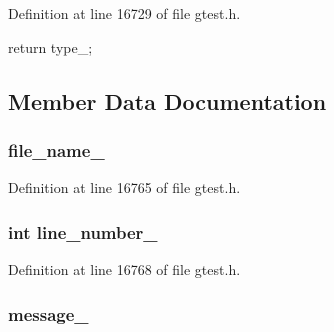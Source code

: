 \-Definition at line 16729 of file gtest.\-h.


\begin{DoxyCode}
{ return type_; }
\end{DoxyCode}


\subsection{\-Member \-Data \-Documentation}
\hypertarget{classtesting_1_1TestPartResult_a7165c07ab2b8f8d7ce5254d3384a32a3}{
\subsubsection[{file\-\_\-name\-\_\-}]{ {\bf file\-\_\-name\-\_\-}}}\label{d9/d98/classtesting_1_1TestPartResult_a7165c07ab2b8f8d7ce5254d3384a32a3}


\-Definition at line 16765 of file gtest.\-h.

\hypertarget{classtesting_1_1TestPartResult_ac2abc3804f68a1a280e475701fe4eeb1}{
\subsubsection[{line\-\_\-number\-\_\-}]{\setlength{\rightskip}{0pt plus 5cm}int {\bf line\-\_\-number\-\_\-}}}\label{d9/d98/classtesting_1_1TestPartResult_ac2abc3804f68a1a280e475701fe4eeb1}


\-Definition at line 16768 of file gtest.\-h.

\hypertarget{classtesting_1_1TestPartResult_ac876aff75e911570267d23362033fc34}{
\subsubsection[{message\-\_\-}]{ {\bf message\-\_\-}}}\label{d9/d98/classtesting_1_1TestPartResult_ac876aff75e911570267d23362033fc34}


